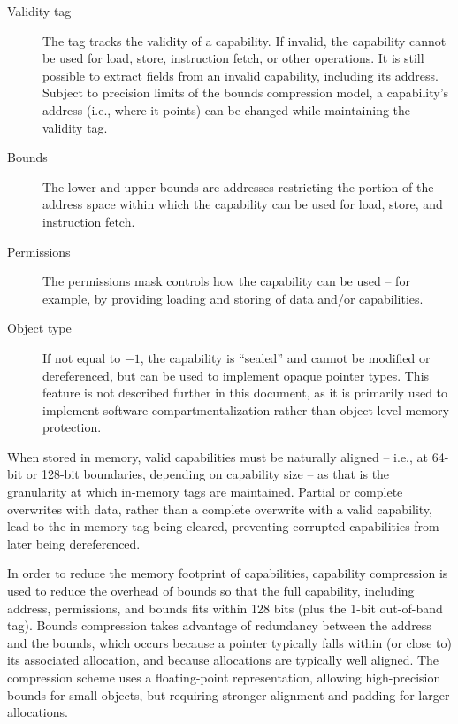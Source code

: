 \documentclass[12pt,twoside,openright,a4paper]{article}
\begin{document}
\begin{description}
\item[Validity tag] The tag tracks the validity of a capability.
  If invalid, the capability cannot be used for load, store, instruction
  fetch, or other operations.
  It is still possible to extract fields from an invalid capability,
  including its address.
  Subject to precision limits of the bounds compression model, a capability's
  address (i.e., where it points) can be changed while maintaining the
  validity tag.

\item[Bounds] The lower and upper bounds are addresses restricting the
  portion of the address space within which the capability can be used for
  load, store, and instruction fetch.

\item[Permissions] The permissions mask controls how the capability can be
  used -- for example, by providing loading and storing of data and/or
  capabilities.

\item[Object type] If not equal to $-1$, the capability is ``sealed'' and
  cannot be modified or dereferenced, but can be used to implement opaque
  pointer types.
  This feature is not described further in this document, as it is primarily
  used to implement software compartmentalization rather than object-level
  memory protection.
\end{description}

When stored in memory, valid capabilities must be naturally aligned -- i.e., at
64-bit or 128-bit boundaries, depending on capability size -- as that is the
granularity at which in-memory tags are maintained.
Partial or complete overwrites with data, rather than a complete overwrite
with a valid capability, lead to the in-memory tag being cleared, preventing
corrupted capabilities from later being dereferenced.

In order to reduce the memory footprint of capabilities, capability
compression is used to reduce the overhead of bounds so that the full
capability, including address, permissions, and bounds fits within 128
bits (plus the 1-bit out-of-band tag).
Bounds compression takes advantage of redundancy between the address
and the bounds, which occurs because a pointer typically falls within (or
close to) its associated allocation, and because allocations are typically
well aligned.
The compression scheme uses a floating-point representation, allowing high-precision bounds for small
objects, but requiring stronger alignment and padding for larger allocations.
\end{document}
